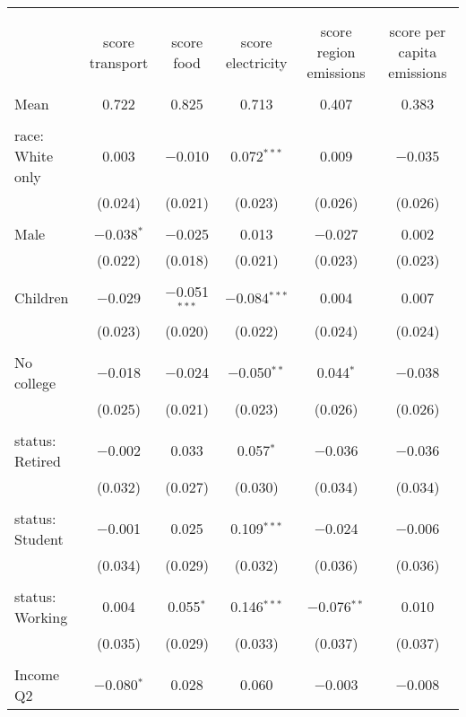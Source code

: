 
\begin{tabular}{@{\extracolsep{5pt}}lccccc} 
\\[-1.8ex]\hline 
\hline \\[-1.8ex] 
\\[-1.8ex] & score transport & score food & score electricity & score region emissions & score per capita emissions \\ 
\hline \\[-1.8ex] 
 Mean & 0.722 & 0.825 & 0.713 & 0.407 & 0.383  \\ \hline \\[-1.8ex] race: White only & 0.003 & $-$0.010 & 0.072$^{***}$ & 0.009 & $-$0.035 \\ 
  & (0.024) & (0.021) & (0.023) & (0.026) & (0.026) \\ 
  & & & & & \\ 
 Male & $-$0.038$^{*}$ & $-$0.025 & 0.013 & $-$0.027 & 0.002 \\ 
  & (0.022) & (0.018) & (0.021) & (0.023) & (0.023) \\ 
  & & & & & \\ 
 Children & $-$0.029 & $-$0.051$^{***}$ & $-$0.084$^{***}$ & 0.004 & 0.007 \\ 
  & (0.023) & (0.020) & (0.022) & (0.024) & (0.024) \\ 
  & & & & & \\ 
 No college & $-$0.018 & $-$0.024 & $-$0.050$^{**}$ & 0.044$^{*}$ & $-$0.038 \\ 
  & (0.025) & (0.021) & (0.023) & (0.026) & (0.026) \\ 
  & & & & & \\ 
 status: Retired & $-$0.002 & 0.033 & 0.057$^{*}$ & $-$0.036 & $-$0.036 \\ 
  & (0.032) & (0.027) & (0.030) & (0.034) & (0.034) \\ 
  & & & & & \\ 
 status: Student & $-$0.001 & 0.025 & 0.109$^{***}$ & $-$0.024 & $-$0.006 \\ 
  & (0.034) & (0.029) & (0.032) & (0.036) & (0.036) \\ 
  & & & & & \\ 
 status: Working & 0.004 & 0.055$^{*}$ & 0.146$^{***}$ & $-$0.076$^{**}$ & 0.010 \\ 
  & (0.035) & (0.029) & (0.033) & (0.037) & (0.037) \\ 
  & & & & & \\ 
 Income Q2 & $-$0.080$^{*}$ & 0.028 & 0.060 & $-$0.003 & $-$0.008 \\ 

\end{tabular}
